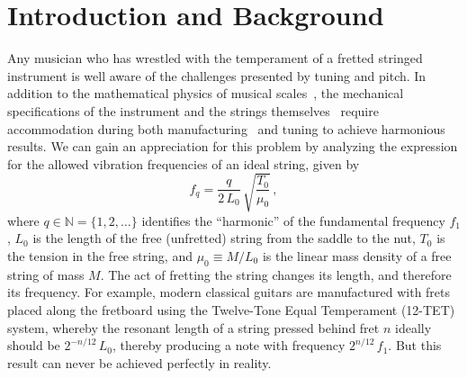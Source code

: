 %
%
%

 \section{Introduction and Background\label{sct:intro}}

Any musician who has wrestled with the temperament of a fretted stringed instrument is well aware of the challenges presented by tuning and pitch. In addition to the mathematical physics of musical scales~\cite{ref:krantz1994mre,ref:hall2001mmi,ref:durfee2015pms}, the mechanical specifications of the instrument and the strings themselves~\cite{ref:morse1981vas,ref:fletcher2005pmi,ref:ramsey2023fag} require accommodation during both manufacturing~\cite{ref:byers1996cgi,ref:varieschi2010icf} and tuning to achieve harmonious results. We can gain an appreciation for this problem by analyzing the expression for the allowed vibration frequencies of an ideal string, given by~\cite{ref:morse1981vsa,ref:fletcher2005pma}
 \begin{equation} \label{eqn:f_0_def}
f_q = \frac{q}{2\, L_0}\, \sqrt{\frac{T_0}{\mu_0}}\, ,
 \end{equation}
where $q \in \mathbb{N} = \{1, 2, \dots\}$ identifies the ``harmonic'' of the fundamental frequency $f_1$, $L_0$ is the length of the free (unfretted) string from the saddle to the nut, $T_0$ is the tension in the free string, and $\mu_0 \equiv M / L_0$ is the linear mass density of a free string of mass $M$. The act of fretting the string changes its length, and therefore its frequency. For example, modern classical guitars are manufactured with frets placed along the fretboard using the Twelve-Tone Equal Temperament (12-TET) system, whereby the resonant length of a string pressed behind fret $n$ ideally should be $2^{-n/12}\, L_0$, thereby producing a note with frequency $2^{n/12}\, f_1$. But this result can never be achieved perfectly in reality. 

